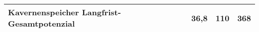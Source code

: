 \begin{table}
\begin{tabular}{|l|l|l|l|}
\hline
\rowcolor[rgb]{0.827,0.886,0.729} Kavernenspeicher Langfrist-Gesamtpotenzial & 36,8                                                                                                                                                                        & 110                                              & 368                                                                                                                             \\
\hline
\end{tabular}
\end{table}


